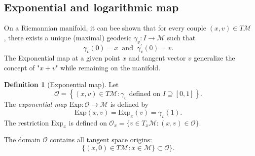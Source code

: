\documentclass[10pt,a4paper]{book}
\theoremstyle{definition}
\newtheorem{defn}{Definition}[section]
\theoremstyle{plain}
\theoremstyle{remark}
\newcommand \M {\mathcal{M}}
\begin{document}
\subsection{Exponential and logarithmic map}
On a Riemannian manifold, it can bee shown that for every couple $(x,v)\in T\M$, there exists a unique (maximal) geodesic $\gamma_v:I\to \M$ such that
$$\gamma_v(0)=x~\text{ and }~\gamma^{\prime}_v(0)=v.$$
The Exponential map at a given point $x$ and tangent vector $v$ generalize the concept of "$x+v$" while remaining on the manifold.
\begin{defn}[Exponential map]
Let
$$\mathcal{O}=\left\{(x,v)\in T \M : \gamma_{v} \text{ defined on }I \supseteq [0,1]\right\}.$$
The \emph{exponential map} $\text{Exp}:\mathcal{O}\to \M$ is defined by
$$\text{Exp}(x,v)=\text{Exp}_x(v)=\gamma_{v}(1).$$
The restriction $\text{Exp}_x$ is defined on $\mathcal{O}_x=\{v\in T_x\M: (x,v)\in \mathcal{O}\}$.
\end{defn}
The domain $\mathcal{O}$ contains all tangent space origins:
$$\{(x,0)\in T \M: x\in \M\}\subset \mathcal{O}\}.$$
\end{document}
